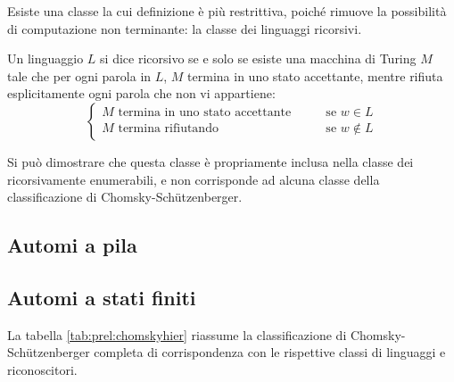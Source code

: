 Esiste una classe la cui definizione è più restrittiva, poiché rimuove la possibilità di computazione non terminante: la classe dei linguaggi ricorsivi.
\begin{defin}
	Un linguaggio $L$ si dice ricorsivo se e solo se esiste una macchina di Turing $M$ tale che per ogni parola in $L$, $M$ termina in uno stato accettante, mentre rifiuta esplicitamente ogni parola che non vi appartiene:
	\begin{equation*}
		\begin{cases}
			\text{$M$ termina in uno stato accettante} \qquad&\text{se } w\in L \\
			\text{$M$ termina rifiutando} \qquad&\text{se } w\notin L
		\end{cases}
	\end{equation*}
\end{defin}
Si può dimostrare che questa classe è propriamente inclusa nella classe dei ricorsivamente enumerabili, e non corrisponde ad alcuna classe della classificazione di Chomsky-Schützenberger.



\subsection{Automi a pila}


\subsection{Automi a stati finiti}

La tabella \ref{tab:prel:chomskyhier} riassume la classificazione di Chomsky-Schützenberger completa di corrispondenza con le rispettive classi di linguaggi e riconoscitori.

